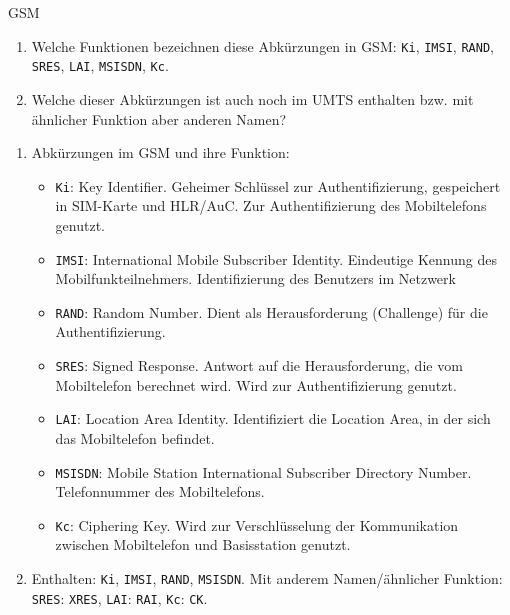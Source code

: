 \documentclass{article}
\begin{document}
\begin{exercise}{GSM}
  \begin{enumerate}
    \item Welche Funktionen bezeichnen diese Abkürzungen in GSM: \texttt{Ki}, \texttt{IMSI}, \texttt{RAND}, \texttt{SRES}, \texttt{LAI}, \texttt{MSISDN}, \texttt{Kc}.
    \item Welche dieser Abkürzungen ist auch noch im UMTS enthalten bzw. mit ähnlicher Funktion aber anderen Namen?
  \end{enumerate}

  \begin{solution}
    \begin{enumerate}
        \item Abkürzungen im GSM und ihre Funktion:
          \begin{itemize}
            \item \texttt{Ki}: Key Identifier. Geheimer Schlüssel zur Authentifizierung, gespeichert in SIM-Karte und HLR/AuC. Zur Authentifizierung des Mobiltelefons genutzt.
            \item \texttt{IMSI}: International Mobile Subscriber Identity. Eindeutige Kennung des Mobilfunkteilnehmers. Identifizierung des Benutzers im Netzwerk
            \item \texttt{RAND}: Random Number. Dient als Herausforderung (Challenge) für die Authentifizierung.
            \item \texttt{SRES}: Signed Response. Antwort auf die Herausforderung, die vom Mobiltelefon berechnet wird. Wird zur Authentifizierung genutzt.
            \item \texttt{LAI}: Location Area Identity. Identifiziert die Location Area, in der sich das Mobiltelefon befindet.
            \item \texttt{MSISDN}: Mobile Station International Subscriber Directory Number. Telefonnummer des Mobiltelefons.
            \item \texttt{Kc}: Ciphering Key. Wird zur Verschlüsselung der Kommunikation zwischen Mobiltelefon und Basisstation genutzt.
          \end{itemize}
        \item Enthalten: \texttt{Ki}, \texttt{IMSI}, \texttt{RAND}, \texttt{MSISDN}. Mit anderem Namen/ähnlicher Funktion: \texttt{SRES}: \texttt{XRES}, \texttt{LAI}: \texttt{RAI}, \texttt{Kc}: \texttt{CK}.
    \end{enumerate}
  \end{solution}
\end{exercise}
\end{document}
